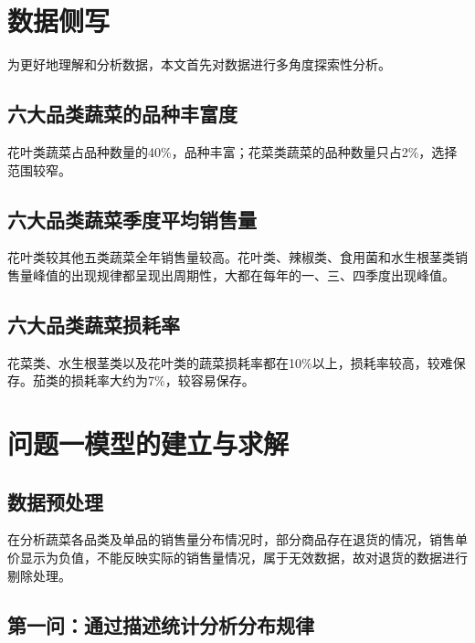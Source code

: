 \documentclass[a4paper,12pt]{article}
\begin{document}
	\newpage
	
	\section{数据侧写}
	
	为更好地理解和分析数据，本文首先对数据进行多角度探索性分析。
	
	\subsection{六大品类蔬菜的品种丰富度}
	
	花叶类蔬菜占品种数量的40\%，品种丰富；花菜类蔬菜的品种数量只占2\%，选择范围较窄。
	
	\subsection{六大品类蔬菜季度平均销售量}
	
	花叶类较其他五类蔬菜全年销售量较高。花叶类、辣椒类、食用菌和水生根茎类销售量峰值的出现规律都呈现出周期性，大都在每年的一、三、四季度出现峰值。
	
	\subsection{六大品类蔬菜损耗率}
	
	花菜类、水生根茎类以及花叶类的蔬菜损耗率都在10\%以上，损耗率较高，较难保存。茄类的损耗率大约为7\%，较容易保存。
	
	\newpage
	
	\section{问题一模型的建立与求解}
	
	\subsection{数据预处理}
	
	在分析蔬菜各品类及单品的销售量分布情况时，部分商品存在退货的情况，销售单价显示为负值，不能反映实际的销售量情况，属于无效数据，故对退货的数据进行剔除处理。
	
	\subsection{第一问：通过描述统计分析分布规律}
	
\end{document}

